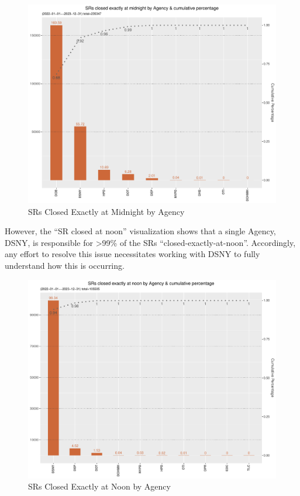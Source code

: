 \documentclass[12pt, titlepage]{article}
\begin{document}
{	\begin{figure}[H]
		 \centering
		 \includegraphics[width = \textwidth]{closed_at_midnight_chart.pdf}
		 \caption{SRs Closed Exactly at Midnight by Agency}
		 \label{fig:midnight-closed}
	\end{figure}	

	However, the ``SR closed at noon'' visualization shows that  a single Agency, DSNY,
	is responsible for \textgreater{}99\% of the SRs ``closed-exactly-at-noon''. Accordingly, any effort to resolve this issue
	necessitates working with DSNY to fully understand how this is occurring. 
	
	\begin{figure}[H]
		 \centering
		 \includegraphics[width = \textwidth]{closed_at_noon_chart.pdf}
		 \caption{SRs Closed Exactly at Noon by Agency}
		 \label{fig:noon-closed}
	\end{figure}	
	
}
\end{document}
